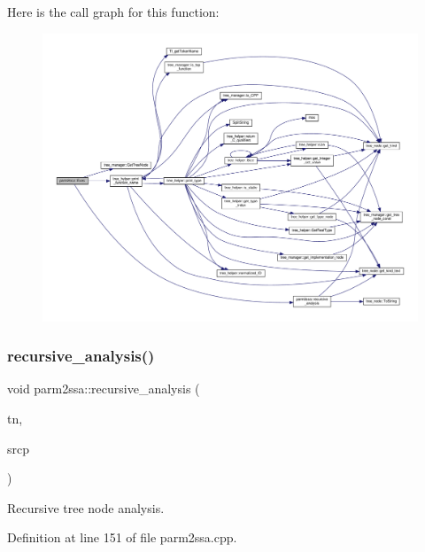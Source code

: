 Here is the call graph for this function\+:
\nopagebreak
\begin{figure}[H]
\begin{center}
\leavevmode
\includegraphics[width=350pt]{dc/d7a/classparm2ssa_ae308e612abcdd8e6cb9dcf490e774065_cgraph}
\end{center}
\end{figure}
\mbox{\label{classparm2ssa_a44867e8c5b5462d813b189778657809e}} 
\subsubsection{\texorpdfstring{recursive\+\_\+analysis()}{recursive\_analysis()}}
{\footnotesize\ttfamily void parm2ssa\+::recursive\+\_\+analysis (\begin{DoxyParamCaption}\item[{\hyperlink{tree__node_8hpp_a6ee377554d1c4871ad66a337eaa67fd5}{tree\+\_\+node\+Ref} \&}]{tn,  }\item[{const std\+::string \&}]{srcp }\end{DoxyParamCaption})\hspace{0.3cm}{\ttfamily [protected]}}



Recursive tree node analysis. 



Definition at line 151 of file parm2ssa.\+cpp.



